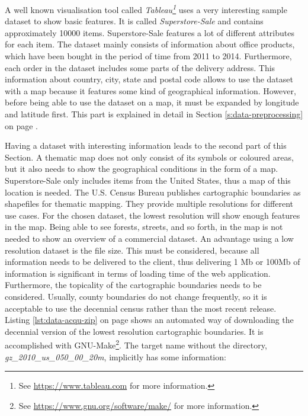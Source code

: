 A well known visualisation tool called \textit{Tableau\footnote{See \href{https://www.tableau.com}{https://www.tableau.com} for more information.}} uses a very interesting sample dataset to show basic features. It is called \textit{Superstore-Sale} and contains approximately 10000 items. Superstore-Sale features a lot of different attributes for each item. The dataset mainly consists of information about office products, which have been bought in the period of time from 2011 to 2014. Furthermore, each order in the dataset includes some parts of the delivery address. This information about country, city, state and postal code allows to use the dataset with a map because it features some kind of geographical information. However, before being able to use the dataset on a map, it must be expanded by longitude and latitude first. This part is explained in detail in Section \ref{s:data-preprocessing} on page \pageref{s:data-preprocessing}.

Having a dataset with interesting information leads to the second part of this Section. A thematic map does not only consist of its symbols or coloured areas, but it also needs to show the geographical conditions in the form of a map. Superstore-Sale only includes items from the United States, thus a map of this location is needed. The U.S. Census Bureau publishes cartographic boundaries as shapefiles for thematic mapping. They provide multiple resolutions for different use cases. For the chosen dataset, the lowest resolution will show enough features in the map. Being able to see forests, streets, and so forth, in the map is not needed to show an overview of a commercial dataset. An advantage using a low resolution dataset is the file size. This must be considered, because all information needs to be delivered to the client, thus delivering 1 \ac{Mb} or 100\ac{Mb} of information is significant in terms of loading time of the web application.
Furthermore, the topicality of the cartographic boundaries needs to be considered. Usually, county boundaries do not change frequently, so it is acceptable to use the decennial census rather than the most recent release. Listing \ref{lst:data-acqu-zip} on page \pageref{lst:data-acqu-zip} shows an automated way of downloading the decennial version of the lowest resolution cartographic boundaries. It is accomplished with GNU-Make\footnote{See \href{https://www.gnu.org/software/make/}{https://www.gnu.org/software/make/} for more information.}. The target name without the directory, \textit{gz\_2010\_us\_050\_00\_20m}, implicitly has some information:


